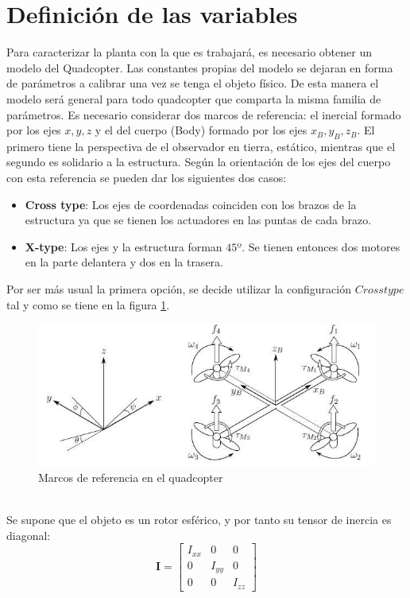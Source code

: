 \documentclass[twoside,11pt]{book}
\begin{document}
\section{Definición de las variables}
Para caracterizar la planta con la que es trabajará, es necesario obtener un modelo del Quadcopter. Las constantes propias del modelo se dejaran en forma de parámetros a calibrar una vez se tenga el objeto físico. De esta manera el modelo será general para todo quadcopter que comparta la misma familia de parámetros.
Es necesario considerar dos marcos de referencia: el inercial formado por los ejes $x,y,z$ y el del cuerpo (Body) formado por los ejes $x_B,y_B,z_B$. El primero tiene la perspectiva de el observador en tierra, estático, mientras que el segundo es solidario a la estructura. Según la orientación de los ejes del cuerpo con esta referencia se pueden dar los siguientes dos casos:
\begin{itemize}
\item \textbf{Cross type}: Los ejes de coordenadas coinciden con los brazos de la estructura ya que se tienen los actuadores en las puntas de cada brazo.
\item \textbf{X-type}: Los ejes y la estructura forman $45º$. Se tienen entonces dos motores en la parte delantera y dos en la trasera.
\end{itemize} 
Por ser más usual la primera opción, se decide utilizar la configuración $Cross type$ tal y como se tiene en la figura \ref{RefQuad}.
\begin{figure}[h!]
\centering
\hspace{2cm}\includegraphics[scale=0.5,bb=0 0 618 261]{images/quad.png}
\caption{Marcos de referencia en el quadcopter}
\label{RefQuad}
\end{figure}\\
Se supone que el objeto es un rotor esférico, y por tanto su tensor de inercia es diagonal:
\begin{equation}\textbf{I}=\left[ \begin{array}{ccc}
I_{xx} & 0 & 0 \\
0 & I_{yy} & 0 \\
0 & 0 & I_{zz} 
\end{array} \right] \end{equation}
\end{document}
